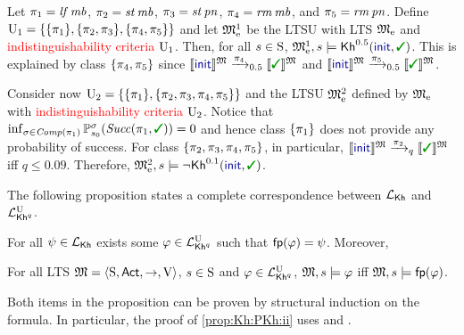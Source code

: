 \begin{example}
  Let
  $\plan_1 = \lift\,\mobile$, $\plan_2 = \stairs\,\mobile$,
  $\plan_3 = \stairs\,\panic$, $\plan_4 = \ramp\,\mobile$, and
  $\plan_5 = \ramp\,\panic$.
  Define
  $\Unc_1 = \{ \{\plan_1\}, \{\plan_2,\plan_3\}, \{\plan_4,\plan_5\}\}$
  and let $\modelex^1$ be the LTSU with LTS $\modelex$ and
  \textcolor{red}{indistinguishability criteria} $\Unc_1$.
  Then, for all $s\in\S$, $\modelex^1, s \models
  \kh^{0.5}(\init,\goal)$.  This is explained by class
  $\{\plan_4,\plan_5\}$ since
  $\truthset{\model}{\init}\reach{\plan_4}_{0.5}\truthset{\model}{\goal}$
  and
  $\truthset{\model}{\init}\reach{\plan_5}_{0.5}\truthset{\model}{\goal}$.

  Consider now
  $\Unc_2 = \{ \{\plan_1\}, \{\plan_2,\plan_3,\plan_4,\plan_5\}\}$
  and the LTSU $\modelex^2$ defined by $\modelex$ with
  \textcolor{red}{indistinguishability criteria} $\Unc_2$.
  Notice that
  $\inf_{\strat\in\Comp(\plan_1)}\Prob^\strat_{s_0}(\Succ(\plan_1,\goal))=0$
  and hence class $\{\plan_1\}$ does not provide any probability of
  success.
  For class $\{\plan_2,\plan_3,\plan_4,\plan_5\}$, in particular,
  $\truthset{\model}{\init}\reach{\plan_2}_q\truthset{\model}{\goal}$
  iff $q\leq 0.09$.
  Therefore, $\modelex^2, s \models \neg \kh^{0.1}(\init,\goal)$.
\end{example}


%
The following proposition states a complete correspondence between
$\Khunc$ and $\PKhunc$.
%
%
\begin{proposition}\label{prop:Khunc:PKhunc}
  \begin{enumerate*}[(1)]
  \item\label{prop:Khunc:PKhunc:i}%
    For all $\psi\in\Khunc$ exists some
    $\varphi\in\PKhunc$ such that $\fgetprob(\varphi)=\psi$.
    Moreover,
  \item\label{prop:Khunc:PKhunc:ii}%
    For all LTS $\model = \tup{\S,\Act,\ra,\V}$, $s\in\S$ and
    $\varphi\in\PKhunc$,
    $\model,s\models\varphi$ iff $\model,s\models\fgetprob(\varphi)$.
  \end{enumerate*}
\end{proposition}

Both items in the proposition can be proven by structural induction on
the formula. In particular, the proof of \cref{prop:Kh:PKh:ii} uses
 and .

